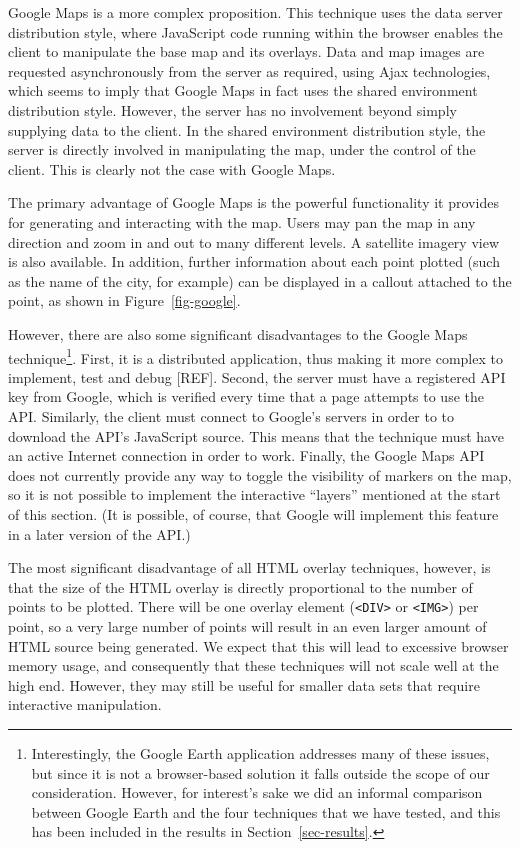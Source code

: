 \documentclass[acmtocl,acmnow]{acmtrans2m}
\begin{document}
Google Maps \cite{Goog-M-2006-maps} is a more complex proposition. This
technique uses the data server distribution style, where JavaScript code
running within the browser enables the client to manipulate the base map
and its overlays. Data and map images are requested asynchronously from
the server as required, using Ajax technologies, which seems to imply
that Google Maps in fact uses the shared environment distribution style.
However, the server has no involvement beyond simply supplying data to
the client. In the shared environment distribution style, the server is
directly involved in manipulating the map, under the control of the
client. This is clearly not the case with Google Maps.

The primary advantage of Google Maps is the powerful functionality it
provides for generating and interacting with the map. Users may pan the
map in any direction and zoom in and out to many different levels. A
satellite imagery view is also available. In addition, further
information about each point plotted (such as the name of the city, for
example) can be displayed in a callout attached to the point, as shown
in Figure~\ref{fig-google}.

However, there are also some significant disadvantages to the Google
Maps technique\footnote{Interestingly, the Google Earth application
addresses many of these issues, but since it is not a browser-based
solution it falls outside the scope of our consideration. However, for
interest's sake we did an informal comparison between Google Earth and
the four techniques that we have tested, and this has been included in
the results in Section~\ref{sec-results}.}. First, it is a distributed
application, thus making it more complex to implement, test and debug
[REF]. Second, the server must have a registered API key from Google,
which is verified every time that a page attempts to use the API.
Similarly, the client must connect to Google's servers in order to to
download the API's JavaScript source. This means that the technique must
have an active Internet connection in order to work. Finally, the Google
Maps API does not currently provide any way to toggle the visibility of
markers on the map, so it is not possible to implement the interactive
``layers'' mentioned at the start of this section. (It is possible, of
course, that Google will implement this feature in a later version of
the API.)

The most significant disadvantage of all HTML overlay techniques,
however, is that the size of the HTML overlay is directly proportional
to the number of points to be plotted. There will be one overlay element
(\verb|<DIV>| or \verb|<IMG>|) per point, so a very large number of
points will result in an even larger amount of HTML source being
generated. We expect that this will lead to excessive browser memory
usage, and consequently that these techniques will not scale well at the
high end. However, they may still be useful for smaller data sets that
require interactive manipulation.
\end{document}
